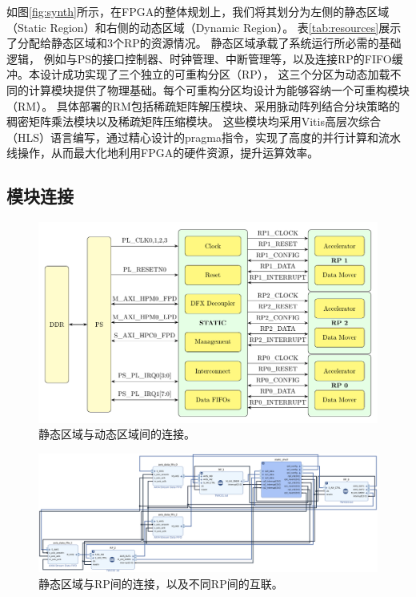如图\ref{fig:synth}所示，在FPGA的整体规划上，我们将其划分为左侧的静态区域（Static Region）和右侧的动态区域（Dynamic Region）。
表\ref{tab:resources}展示了分配给静态区域和3个RP的资源情况。
静态区域承载了系统运行所必需的基础逻辑，
例如与PS的接口控制器、时钟管理、中断管理等，以及连接RP的FIFO缓冲。本设计成功实现了三个独立的可重构分区（RP），
这三个分区为动态加载不同的计算模块提供了物理基础。每个可重构分区均设计为能够容纳一个可重构模块（RM）。
具体部署的RM包括稀疏矩阵解压模块、采用脉动阵列结合分块策略的稠密矩阵乘法模块以及稀疏矩阵压缩模块。
这些模块均采用Vitis高层次综合（HLS）语言编写，通过精心设计的pragma指令，实现了高度的并行计算和流水线操作，从而最大化地利用FPGA的硬件资源，提升运算效率。

\subsection{模块连接}

\begin{figure}[htbp]
\centerline{\includegraphics[width=0.8\columnwidth]{figures/arch.pdf}}
\caption{静态区域与动态区域间的连接。}
\label{fig:arch}
\end{figure}

\begin{figure}[htbp]
\centerline{\includegraphics[width=\columnwidth]{figures/dfx.png}}
\caption{静态区域与RP间的连接，以及不同RP间的互联。}
\label{fig:dfx}
\end{figure}

